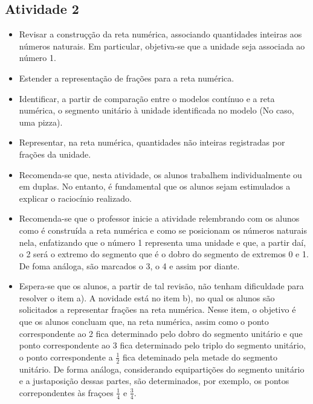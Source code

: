 \begin{multicols}{2}
\subsection{Atividade 2}

\begin{itemize} %
    \item       Revisar a construçção da reta numérica, associando quantidades inteiras aos números naturais. Em particular, objetiva-se que a unidade seja associada ao número 1.
    \item       Estender a representação de frações para a reta numérica. 
    \item       Identificar, a partir de comparação entre o modelos contínuo e a reta numérica, o segmento unitário à unidade identificada no modelo (No caso, uma pizza).
    \item       Representar, na reta numérica, quantidades não inteiras registradas por frações da unidade. 
\end{itemize} %
      
     
\begin{itemize} %
    \item        Recomenda-se que, nesta atividade, os alunos trabalhem individualmente ou em duplas. No entanto, é fundamental que os alunos sejam estimulados a explicar o raciocínio realizado.
    \item        Recomenda-se que o professor inicie a atividade relembrando com os alunos como é construída a reta numérica e como se posicionam os números naturais nela, enfatizando que o número 1 representa uma unidade e que, a partir daí, o 2 será o extremo do segmento que é o dobro do segmento de extremos 0 e 1. De foma análoga, são marcados o 3, o 4 e assim por diante.
    \item       Espera-se que os alunos, a partir de tal revisão, não tenham dificuldade para resolver o item a). A novidade está no item b), no qual os alunos são solicitados a representar frações na reta numérica. Nesse item, o objetivo é que os alunos concluam que, na reta numérica, assim como o ponto correspondente ao 2 fica determinado pelo dobro do segmento unitário e que ponto correspondente ao 3 fica determinado pelo triplo do segmento unitário, o ponto correspondente a       $\frac{1}{2}$       fica deteminado pela metade do segmento unitário. De forma análoga, considerando equipartições do segmento unitário e a justaposição dessas partes, são determinados, por exemplo, os pontos correpondentes às fraçoes       $\frac{1}{4}$       e       $\frac{3}{4}$.
\end{itemize} %


\end{multicols}
